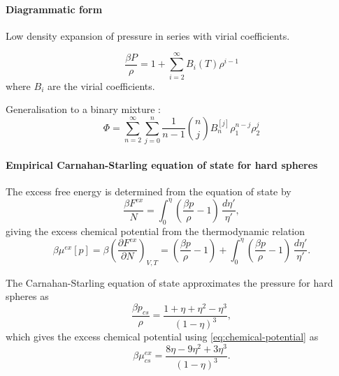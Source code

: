 \paragraph{Diagrammatic form}
Low density expansion of pressure in series with virial coefficients.

\begin{equation}
  \frac{\beta P}{\rho} =
  1 + \sum_{i=2}^\infty B_i(T) \rho^{i-1}
\end{equation}
where $B_i$ are the virial coefficients.

Generalisation to a binary mixture : \cite{Hansen-Goos2014}
\begin{equation}\label{eq:virial-series-binary}
  \Phi = \sum_{n=2}^\infty \sum_{j=0}^{n}
  \frac{1}{n-1} {n \choose j} B_n^{[j]} \rho_1^{n-j} \rho_2^j
\end{equation}

\paragraph{Empirical Carnahan-Starling equation of state for hard spheres}

The excess free energy is determined from the equation of state by
\begin{equation}
  \frac{\beta F^{ex}}{N}
  = \int_0^\eta \left( \frac{\beta p}{\rho} - 1 \right) \, \frac{d\eta'}{\eta'},
\end{equation}
giving the excess chemical potential from the thermodynamic relation
\begin{equation}\label{eq:chemical-potential}
  \beta \mu^{ex}[p]
  = \beta \left( \frac{\partial F^{ex}}{\partial N} \right)_{V,T}
  = \left( \frac{\beta p}{\rho} - 1 \right)
  + \int_0^\eta \left( \frac{\beta p}{\rho} - 1 \right) \, \frac{d\eta'}{\eta'}.
\end{equation}

The Carnahan-Starling equation of state approximates the pressure for hard spheres as \cite{Carnahan1969}
\begin{equation}\label{eq:cs-pressure}
  \frac{\beta p_{cs}}{\rho} = \frac{1 + \eta + \eta^2 - \eta^3}{(1-\eta)^3},
\end{equation}
which gives the excess chemical potential using \eqref{eq:chemical-potential} as
\begin{equation}\label{eq:cs-mu}
  \beta \mu_{cs}^{ex} = \frac{8\eta - 9\eta^2 + 3\eta^3}{(1-\eta)^3}.
\end{equation}

